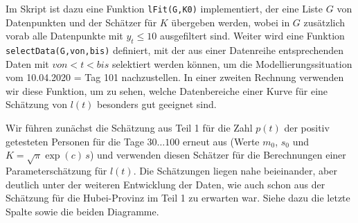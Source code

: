 \documentclass[a4paper,11pt]{article}
\begin{document}
Im Skript ist dazu eine Funktion \texttt{lFit(G,K0)} implementiert, der eine
Liste $G$ von Datenpunkten und der Schätzer für $K$ übergeben werden, wobei in
$G$ zusätzlich vorab alle Datenpunkte mit $y_t\le 10$ ausgefiltert sind.
Weiter wird eine Funktion \texttt{selectData(G,von,bis)} definiert, mit der
aus einer Datenreihe entsprechenden Daten mit $von<t<bis$ selektiert werden
können, um die Modellierungssituation vom 10.04.2020 = Tag 101 nachzustellen.
In einer zweiten Rechnung verwenden wir diese Funktion, um zu sehen, welche
Datenbereiche einer Kurve für eine Schätzung von $l(t)$ besonders gut geeignet
sind.

Wir führen zunächst die Schätzung aus Teil 1 für die Zahl $p(t)$ der positiv
getesteten Personen für die Tage $30\dots 100$ erneut aus (Werte $m_0$, $s_0$
und $K=\sqrt{\pi}\exp(c)\,s$) und verwenden diesen Schätzer für die
Berechnungen einer Parameterschätzung für $l(t)$. Die Schätzungen liegen nahe
beieinander, aber deutlich unter der weiteren Entwicklung der Daten, wie auch
schon aus der Schätzung für die Hubei-Provinz im Teil 1 zu erwarten war.
Siehe dazu die letzte Spalte sowie die beiden Diagramme.
\end{document}
